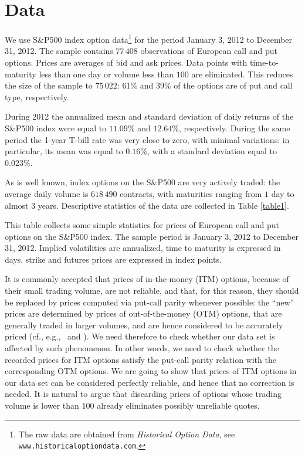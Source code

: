 \documentclass[11pt]{article}
\theoremstyle{remark}
\begin{document}


\section{Data}
\label{sec:data}
We use S\&P500 index option data\footnote{The raw data are obtained
  from \emph{Historical Option Data}, see
  \texttt{www.historicaloptiondata.com}.} for the period January 3,
2012 to December 31, 2012. The sample contains $77\,408$ observations of
European call and put options. Prices are averages of bid and ask
prices.  Data points with time-to-maturity less than one day or volume
less than $100$ are eliminated. This reduces the size of the sample to
$75\,022$: 61\% and 39\% of the options are of put and call type,
respectively.

During 2012 the annualized mean and standard deviation of daily
returns of the S\&P500 index were equal to $11.09\%$ and $12.64\%$,
respectively. During the same period the 1-year T-bill rate was very
close to zero, with minimal variations: in particular, its mean was
equal to $0.16\%$, with a standard deviation equal to $0.023\%$.

As is well known, index options on the S\&P500 are very actively
traded: the average daily volume is $618\,490$ contracts, with
maturities ranging from $1$ day to almost $3$ years. Descriptive
statistics of the data are collected in Table
\ref{table1}.

\begin{table}[tbp]
\caption{Summary statistics for S\&P500 index options data}
\begin{center}
\vspace{2mm}
\parbox{\textwidth}{\footnotesize This table collects some simple
  statistics for prices of European call and put options on the
  S\&P500 index. The sample period is January 3, 2012 to December 31,
  2012. Implied volatilities are annualized, time to maturity is
  expressed in days, strike and futures prices are expressed in index
  points.  \vspace{4mm}}
\footnotesize{{}}
\end{center}
\label{table1}
\end{table}

It is commonly accepted that prices of in-the-money (ITM) options,
because of their small trading volume, are not reliable, and that, for
this reason, they should be replaced by prices computed via put-call
parity whenever possible: the ``new'' prices are determined by prices
of out-of-the-money (OTM) options, that are generally traded in larger
volumes, and are hence considered to be accurately priced (cf.,
e.g.,~\cite[p.~517-ff.]{AL} and \cite{CarrWu:03}). We need therefore
to check whether our data set is affected by such phenomenon. In other
words, we need to check whether the recorded prices for ITM options
satisfy the put-call parity relation with the corresponding OTM
options. We are going to show that prices of ITM options in our data
set can be considered perfectly reliable, and hence that no correction
is needed. It is natural to argue that discarding prices of options
whose trading volume is lower than 100 already eliminates possibly
unreliable quotes.
\end{document}

